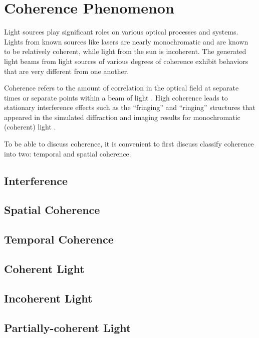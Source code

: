 \chapter{Coherence Phenomenon}
\hspace{\parindent}
Light sources play significant roles on various optical processes and systems. Lights from known sources like lasers are nearly monochromatic and are known to be relatively coherent, while light from the sun is incoherent. The generated light beams from light sources of various degrees of coherence exhibit behaviors that are very different from one another. 

Coherence refers to the amount of correlation in the optical field at separate times or separate points within a beam of light \cite{Voelzbook}. High coherence leads to stationary interference effects such as the “fringing” and “ringing” structures that appeared in the simulated diffraction and imaging results for monochromatic (coherent) light \cite{Voelzbook}.

To be able to discuss coherence, it is convenient to first discuss classify coherence into two: temporal and spatial coherence. 

\section{Interference}
\hspace{\parindent} 




\section{Spatial Coherence}



\section{Temporal Coherence}



\section{Coherent Light}






\section{Incoherent Light}







\section{Partially-coherent Light}